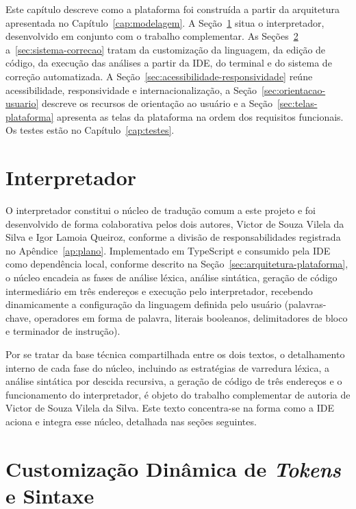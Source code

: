 Este capítulo descreve como a plataforma foi construída a partir da arquitetura apresentada no Capítulo~\ref{cap:modelagem}. A Seção~\ref{sec:interpretador-nucleo} situa o interpretador, desenvolvido em conjunto com o trabalho complementar. As Seções~\ref{sec:customizacao-dinamica} a~\ref{sec:sistema-correcao} tratam da customização da linguagem, da edição de código, da execução das análises a partir da IDE, do terminal e do sistema de correção automatizada. A Seção~\ref{sec:acessibilidade-responsividade} reúne acessibilidade, responsividade e internacionalização, a Seção~\ref{sec:orientacao-usuario} descreve os recursos de orientação ao usuário e a Seção~\ref{sec:telas-plataforma} apresenta as telas da plataforma na ordem dos requisitos funcionais. Os testes estão no Capítulo~\ref{cap:testes}.

\section{Interpretador}
\label{sec:interpretador-nucleo}

O interpretador constitui o núcleo de tradução comum a este projeto e foi desenvolvido de forma colaborativa pelos dois autores, Victor de Souza Vilela da Silva e Igor Lamoia Queiroz, conforme a divisão de responsabilidades registrada no Apêndice~\ref{ap:plano}. Implementado em TypeScript e consumido pela IDE como dependência local, conforme descrito na Seção~\ref{sec:arquitetura-plataforma}, o núcleo encadeia as fases de análise léxica, análise sintática, geração de código intermediário em três endereços e execução pelo interpretador, recebendo dinamicamente a configuração da linguagem definida pelo usuário (palavras-chave, operadores em forma de palavra, literais booleanos, delimitadores de bloco e terminador de instrução).

Por se tratar da base técnica compartilhada entre os dois textos, o detalhamento interno de cada fase do núcleo, incluindo as estratégias de varredura léxica, a análise sintática por descida recursiva, a geração de código de três endereços e o funcionamento do interpretador, é objeto do trabalho complementar de autoria de Victor de Souza Vilela da Silva. Este texto concentra-se na forma como a IDE aciona e integra esse núcleo, detalhada nas seções seguintes.

\section{Customização Dinâmica de \textit{Tokens} e Sintaxe}
\label{sec:customizacao-dinamica}

